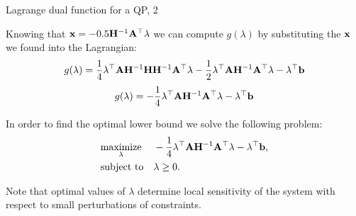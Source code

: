 \documentclass{beamer}
\begin{document}
\begin{frame}{Lagrange dual function for a QP, 2}
	\begin{flushleft}
		
		Knowing that $\mathbf{x} = -0.5\mathbf{H}^{-1}\mathbf{A}^\top \lambda$ we can compute $g(\lambda)$ by substituting the $\mathbf{x}$ we found into the Lagrangian:
		\begin{equation}
			g(\lambda) = \frac{1}{4} \lambda^\top \mathbf{A}\mathbf{H}^{-1}\mathbf{H}\mathbf{H}^{-1}\mathbf{A}^\top\lambda - \frac{1}{2} \lambda^\top \mathbf{A}\mathbf{H}^{-1}\mathbf{A}^\top \lambda - \lambda^\top\mathbf{b}
		\end{equation}
	\begin{equation}
		g(\lambda) = -\frac{1}{4} \lambda^\top \mathbf{A}\mathbf{H}^{-1}\mathbf{A}^\top\lambda - \lambda^\top\mathbf{b}
	\end{equation}
		
		In order to find the optimal lower bound we solve the following problem:
		\begin{equation}
			\begin{aligned}
				& \underset{\lambda}{\text{maximize}}
				& & -\frac{1}{4} \lambda^\top \mathbf{A}\mathbf{H}^{-1}\mathbf{A}^\top\lambda - \lambda^\top\mathbf{b}, \\
				& \text{subject to}
				& & \lambda \geq 0.
			\end{aligned}
		\end{equation}
		
		Note that optimal values of $\lambda$ determine local sensitivity of the system with respect to small perturbations of constraints.
		
	\end{flushleft}
\end{frame}
\end{document}
